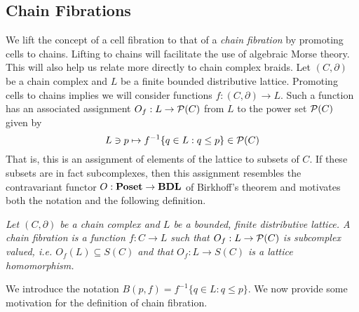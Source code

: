\subsection{Chain Fibrations}

We lift the concept of a cell fibration to that of a {\em chain fibration} by promoting cells to chains.  Lifting to chains will facilitate the use of algebraic Morse theory.  This will also help us relate more directly to chain complex braids.  Let $(C,\partial)$ be a chain complex and $L$ be a finite bounded distributive lattice.  Promoting cells to chains implies we will consider functions $f:(C,\partial)\to L$.  Such a function has an associated assignment  $O_f:L\to {\mathcal P}(C)$ from $L$ to the power set ${\mathcal P}(C)$ given by $$L\ni p\mapsto f^{-1}\{q\in L:q\leq p\}\in {\mathcal P}(C)$$  That is, this is an assignment of elements of the lattice to subsets of $C$.  If these subsets are in fact subcomplexes, then this assignment resembles the contravariant functor $O:{\bf Poset}\to {\bf BDL}$ of Birkhoff's theorem and motivates both the notation and the following definition.  


\begin{defn}\label{def:}
{\em
Let $(C,\partial)$ be a chain complex and $L$ be a bounded, finite distributive lattice.  A {\em chain fibration} is a function $f:C\to L$ such that $O_f:L\to {\mathcal P}(C)$ is subcomplex valued, i.e. $O_f(L)\subseteq S(C)$ and that $O_f:L\to S(C)$ is a lattice homomorphism.
}
\end{defn}


We introduce the notation $B(p,f)=f^{-1}\{q\in L:q\leq p\}$.  We now provide some motivation for the definition of chain fibration.


